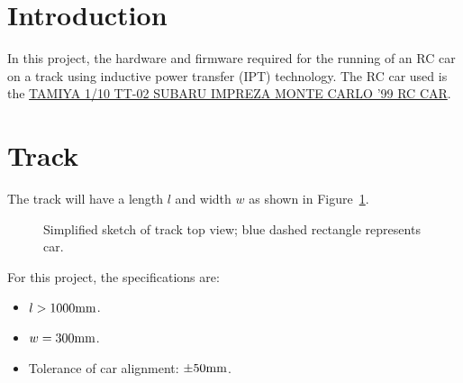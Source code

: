 


    \maketitle

    \section{Introduction}
    In this project, the hardware and firmware required for the running of an RC car on a track using inductive power transfer (IPT) 
    technology. The RC car used is the \href{https://www.rchobbies.co.nz/tamiya-1-10-tt-02-subaru-impreza-monte-carlo-99-rc-car/}
    {TAMIYA 1/10 TT-02 SUBARU IMPREZA MONTE CARLO '99 RC CAR}. 

    \section{Track}
    The track will have a length $l$ and width $w$ as shown in Figure~\ref{track_top_view}. 
    \begin{figure}[H]
        \centering 
        \caption{Simplified sketch of track top view; blue dashed rectangle represents car.}\label{track_top_view}
    \end{figure}

    For this project, the specifications are: 
    \begin{itemize}
        \item $l > 1000\rm mm$. 
        \item $w = 300\rm mm$. 
        \item Tolerance of car alignment: $\pm 50\rm mm$. 
    \end{itemize}

